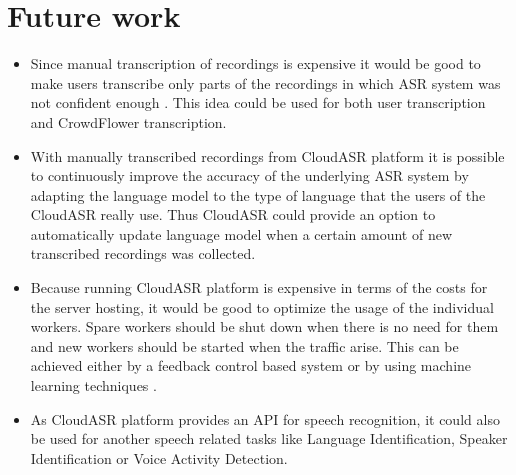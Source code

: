 \section*{Future work}
\begin{itemize}
  \item
    Since manual transcription of recordings is expensive
      it would be good to make users transcribe only parts of the recordings
      in which ASR system was not confident enough \cite{sperber2014fly}.
    This idea could be used for both user transcription and CrowdFlower transcription.

  \item
    With manually transcribed recordings from CloudASR platform
      it is possible to continuously improve the accuracy of the underlying ASR system
      by adapting the language model to the type of language that the users of the CloudASR really use.
    Thus CloudASR could provide an option to automatically update language model
      when a certain amount of new transcribed recordings was collected.

  \item
    Because running CloudASR platform is expensive in terms of the costs for the server hosting,
      it would be good to optimize the usage of the individual workers.
    Spare workers should be shut down when there is no need for them
      and new workers should be started when the traffic arise.
    This can be achieved either by a feedback control based system \cite{janert2013feedback}
      or by using machine learning techniques \cite{gong2010press}.

  \item
    As CloudASR platform provides an API for speech recognition,
      it could also be used for another speech related tasks like Language Identification, Speaker Identification or Voice Activity Detection.

\end{itemize}



